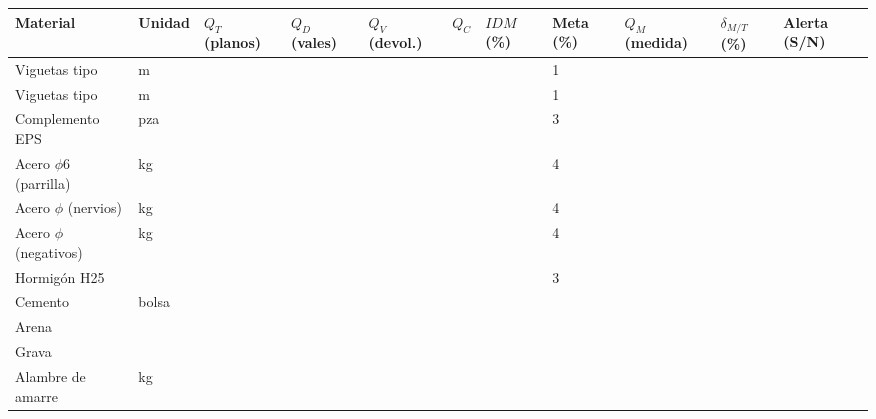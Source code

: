 \medskip
{}\par\smallskip
{\footnotesize{}\renewcommand{\arraystretch}{1.3}\setlength{\tabcolsep}{2.5pt}
\noindent\begin{tabularx}{\linewidth}{@{}|L|Q{1.0cm}|Q{1.25cm}|Q{1.2cm}|Q{1.2cm}|Q{1.0cm}|Q{1.1cm}|Q{0.9cm}|Q{1.2cm}|Q{1.1cm}|Q{1.1cm}|@{}}
\hline
\textbf{Material} & \textbf{Unidad} & \textbf{$Q_T$ (planos)} & \textbf{$Q_D$ (vales)} & \textbf{$Q_V$ (devol.)} & \textbf{$Q_C$} & \textbf{$IDM$ (\%)} & \textbf{Meta (\%)} & \textbf{$Q_M$ (medida)} & \textbf{$\delta_{M/T}$ (\%)} & \textbf{Alerta (S/N)} \\ \hline
Viguetas tipo \underline{\hspace{0.6cm}} & m & & & & & & 1 & & & \\ \hline
Viguetas tipo \underline{\hspace{0.6cm}} & m & & & & & & 1 & & & \\ \hline
Complemento EPS & pza & & & & & & 3 & & & \\ \hline
Acero $\phi$6 (parrilla) & kg & & & & & & 4 & & & \\ \hline
Acero $\phi$ \underline{\hspace{0.5cm}} (nervios) & kg & & & & & & 4 & & & \\ \hline
Acero $\phi$ \underline{\hspace{0.5cm}} (negativos) & kg & & & & & & 4 & & & \\ \hline
Hormigón H25 & \mtres{} & & & & & & 3 & & & \\ \hline
Cemento & bolsa & & & & & & & & & \\ \hline
Arena & \mtres{} & & & & & & & & & \\ \hline
Grava & \mtres{} & & & & & & & & & \\ \hline
Alambre de amarre & kg & & & & & & & & & \\ \hline
\end{tabularx}\par}

